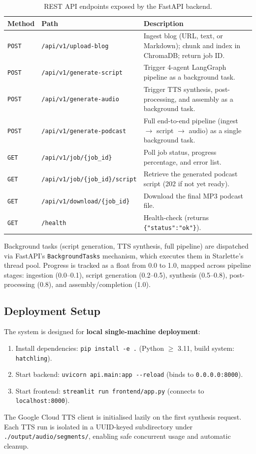 \documentclass[sigconf,natbib=false]{acmart}   %
\begin{document}
\begin{table}[H]
\centering
\small
\begin{tabular}{llp{5.2cm}}
\toprule
\textbf{Method} & \textbf{Path} & \textbf{Description}\\
\midrule
\texttt{POST} & \texttt{/api/v1/upload-blog}     & Ingest blog (URL, text, or Markdown); chunk and index in ChromaDB; return job ID.\\
\texttt{POST} & \texttt{/api/v1/generate-script}  & Trigger 4-agent LangGraph pipeline as a background task.\\
\texttt{POST} & \texttt{/api/v1/generate-audio}   & Trigger TTS synthesis, post-processing, and assembly as a background task.\\
\texttt{POST} & \texttt{/api/v1/generate-podcast} & Full end-to-end pipeline (ingest $\to$ script $\to$ audio) as a single background task.\\
\texttt{GET}  & \texttt{/api/v1/job/\{job\_id\}}         & Poll job status, progress percentage, and error list.\\
\texttt{GET}  & \texttt{/api/v1/job/\{job\_id\}/script}  & Retrieve the generated podcast script (202 if not yet ready).\\
\texttt{GET}  & \texttt{/api/v1/download/\{job\_id\}}    & Download the final MP3 podcast file.\\
\texttt{GET}  & \texttt{/health}                  & Health-check (returns \texttt{\{"status":"ok"\}}).\\
\bottomrule
\end{tabular}
\caption{REST API endpoints exposed by the FastAPI backend.}
\label{tab:endpoints}
\end{table}

Background tasks (script generation, TTS synthesis, full pipeline) are dispatched via FastAPI's \texttt{BackgroundTasks} mechanism, which executes them in Starlette's thread pool.  Progress is tracked as a float from 0.0 to 1.0, mapped across pipeline stages: ingestion (0.0--0.1), script generation (0.2--0.5), synthesis (0.5--0.8), post-processing (0.8), and assembly/completion (1.0).

\subsection{Deployment Setup}
The system is designed for \textbf{local single-machine deployment}:
\begin{enumerate}[nosep]
  \item Install dependencies: \texttt{pip install -e .} (Python $\ge$ 3.11, build system: \texttt{hatchling}).
  \item Start backend: \texttt{uvicorn api.main:app {-}{-}reload} (binds to \texttt{0.0.0.0:8000}).
  \item Start frontend: \texttt{streamlit run frontend/app.py} (connects to \texttt{localhost:8000}).
\end{enumerate}
The Google Cloud TTS client is initialised lazily on the first synthesis request.  Each TTS run is isolated in a UUID-keyed subdirectory under \texttt{./output/audio/segments/}, enabling safe concurrent usage and automatic cleanup.
\end{document}
